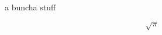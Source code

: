 \documentclass[12pt]{article}
\begin{document}
\large
a buncha
stuff

\begin{equation}
\sqrt{\pi}
\end{equation}
\end{document}
